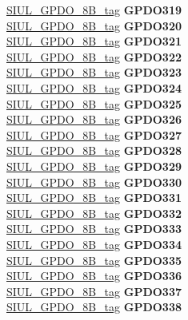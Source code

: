 \begin{DoxyCompactItemize}
\begin{tabbing}
\>\>\mbox{\hyperlink{unionSIUL__GPDO__8B__tag}{SIUL\_GPDO\_8B\_tag}} {\bfseries GPDO319}\\
\>\>\mbox{\hyperlink{unionSIUL__GPDO__8B__tag}{SIUL\_GPDO\_8B\_tag}} {\bfseries GPDO320}\\
\>\>\mbox{\hyperlink{unionSIUL__GPDO__8B__tag}{SIUL\_GPDO\_8B\_tag}} {\bfseries GPDO321}\\
\>\>\mbox{\hyperlink{unionSIUL__GPDO__8B__tag}{SIUL\_GPDO\_8B\_tag}} {\bfseries GPDO322}\\
\>\>\mbox{\hyperlink{unionSIUL__GPDO__8B__tag}{SIUL\_GPDO\_8B\_tag}} {\bfseries GPDO323}\\
\>\>\mbox{\hyperlink{unionSIUL__GPDO__8B__tag}{SIUL\_GPDO\_8B\_tag}} {\bfseries GPDO324}\\
\>\>\mbox{\hyperlink{unionSIUL__GPDO__8B__tag}{SIUL\_GPDO\_8B\_tag}} {\bfseries GPDO325}\\
\>\>\mbox{\hyperlink{unionSIUL__GPDO__8B__tag}{SIUL\_GPDO\_8B\_tag}} {\bfseries GPDO326}\\
\>\>\mbox{\hyperlink{unionSIUL__GPDO__8B__tag}{SIUL\_GPDO\_8B\_tag}} {\bfseries GPDO327}\\
\>\>\mbox{\hyperlink{unionSIUL__GPDO__8B__tag}{SIUL\_GPDO\_8B\_tag}} {\bfseries GPDO328}\\
\>\>\mbox{\hyperlink{unionSIUL__GPDO__8B__tag}{SIUL\_GPDO\_8B\_tag}} {\bfseries GPDO329}\\
\>\>\mbox{\hyperlink{unionSIUL__GPDO__8B__tag}{SIUL\_GPDO\_8B\_tag}} {\bfseries GPDO330}\\
\>\>\mbox{\hyperlink{unionSIUL__GPDO__8B__tag}{SIUL\_GPDO\_8B\_tag}} {\bfseries GPDO331}\\
\>\>\mbox{\hyperlink{unionSIUL__GPDO__8B__tag}{SIUL\_GPDO\_8B\_tag}} {\bfseries GPDO332}\\
\>\>\mbox{\hyperlink{unionSIUL__GPDO__8B__tag}{SIUL\_GPDO\_8B\_tag}} {\bfseries GPDO333}\\
\>\>\mbox{\hyperlink{unionSIUL__GPDO__8B__tag}{SIUL\_GPDO\_8B\_tag}} {\bfseries GPDO334}\\
\>\>\mbox{\hyperlink{unionSIUL__GPDO__8B__tag}{SIUL\_GPDO\_8B\_tag}} {\bfseries GPDO335}\\
\>\>\mbox{\hyperlink{unionSIUL__GPDO__8B__tag}{SIUL\_GPDO\_8B\_tag}} {\bfseries GPDO336}\\
\>\>\mbox{\hyperlink{unionSIUL__GPDO__8B__tag}{SIUL\_GPDO\_8B\_tag}} {\bfseries GPDO337}\\
\>\>\mbox{\hyperlink{unionSIUL__GPDO__8B__tag}{SIUL\_GPDO\_8B\_tag}} {\bfseries GPDO338}\\

\end{tabbing}
\end{DoxyCompactItemize}
